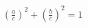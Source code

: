 \documentclass[preview]{standalone}
\begin{document}
\begin{align*}
\left(\frac{a}{c}\right)^2 + \left(\frac{b}{c}\right)^2 = 1
\end{align*}
\end{document}
